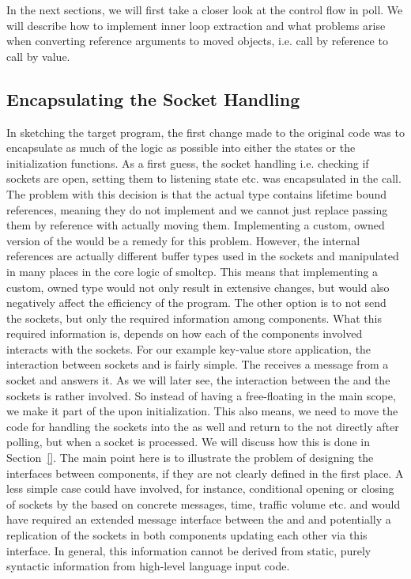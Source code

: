In the next sections, we will first take a closer look at the control flow in poll. We will describe how to implement inner loop extraction and what problems arise when converting reference arguments to moved objects, i.e. call by reference to call by value.

\subsection{Encapsulating the Socket Handling}
\label{subsec:SocketHandling}
In sketching the target program, the first change made to the original code was to encapsulate as much of the logic as possible into either the states or the initialization functions. As a first guess, the socket handling i.e. checking if sockets are open, setting them to listening state etc. was encapsulated in the  call. The problem with this decision is that the actual  type contains lifetime bound references, meaning they do not implement  and we cannot just replace passing them by reference with actually moving them. Implementing a custom, owned version of the  would be a remedy for this problem. However, the internal references are actually different buffer types used in the sockets and manipulated in many places in the core logic of smoltcp. This means that implementing a custom, owned  type would not only result in extensive changes, but would also negatively affect the efficiency of the program. The other option is to not send the sockets, but only the required information among components. What this required information is, depends on how each of the components involved interacts with the sockets. For our example key-value store application, the interaction between sockets and \store{} is fairly simple. The \store{} receives a message from a socket and answers it. As we will later see, the interaction between the \stack{} and the sockets is rather involved. So instead of having a free-floating  in the main scope, we make it part of the \stack{} upon initialization. This also means, we need to move the code for handling the sockets into the \stack{} as well and return to the \store{} not directly after polling, but when a socket is processed. We will discuss how this is done in Section~\ref{}. The main point here is to illustrate the problem of designing the interfaces between components, if they are not clearly defined in the first place. A less simple case could have involved, for instance, conditional opening or closing of sockets by the \store{} based on concrete messages, time, traffic volume etc. and would have required an extended message interface between the \stack{} and \store{} and potentially a replication of the sockets in both components updating each other via this interface. In general, this information cannot be derived from static, purely syntactic information from high-level language input code.

